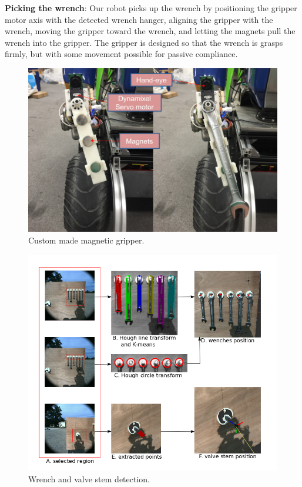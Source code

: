 \documentclass{standalone}
\begin{document}
\textbf{Picking the wrench}: Our robot picks up the wrench by positioning the gripper motor axis with the detected wrench hanger, aligning the gripper with the wrench, moving the gripper toward the wrench, and letting the magnets pull the wrench into the gripper. The gripper is designed so that the wrench is grasps firmly, but with some movement possible for passive compliance.

\begin{figure}
  \includegraphics[width=\columnwidth]{sections/task2/images/gripper}
  \caption{Custom made magnetic gripper.}
  \label{fig:figure2}
\end{figure}

\begin{figure}[b]
  \includegraphics[width=\columnwidth]{sections/task2/images/detection}
  \caption{Wrench and valve stem detection.}
  \label{fig:figure3}
\end{figure}
\end{document}
